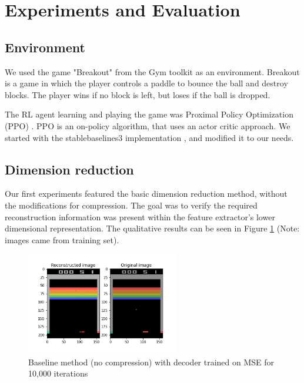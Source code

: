 \section{Experiments and Evaluation}
\subsection{Environment}
We used the game "Breakout" from the Gym toolkit \cite{brockman2016openai} as an
environment. Breakout is a game in which the player controls a paddle to bounce the ball and destroy blocks. The player wins if no block is left, but loses if the ball is dropped.

The RL agent learning and playing the game was Proximal
Policy Optimization (PPO) \cite{raffin2019stable}. PPO is an on-policy
algorithm, that uses an actor critic approach. We started with the stablebaselines3 implementation \cite{raffin2019stable}, and
modified it to our needs.

\subsection{Dimension reduction}
Our first experiments featured the basic dimension reduction method,
without the modifications for compression. The goal was to verify the
required reconstruction information was present within the feature extractor's lower dimensional
representation. The qualitative results can be
seen in Figure \ref{fig:baseline_MSE} (Note: images came
from training set). \\

\begin{figure}[H]
    \centering
    \includegraphics[width=0.6\textwidth]{images/orig_reconstructed0.0.png}
    \caption{Baseline method (no compression) with decoder trained on MSE for 10,000 iterations}
    \label{fig:baseline_MSE}
\end{figure}


